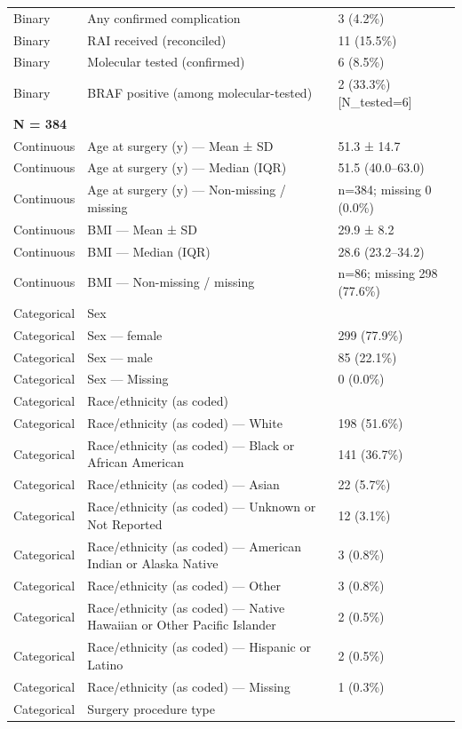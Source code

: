 \begin{table}[htbp]
\begin{tabular}{lll}
Binary & Any confirmed complication & 3 (4.2\%) \\
Binary & RAI received (reconciled) & 11 (15.5\%) \\
Binary & Molecular tested (confirmed) & 6 (8.5\%) \\
Binary & BRAF positive (among molecular-tested) & 2 (33.3\%) [N\_tested=6] \\
\multicolumn{3}{l}{\textbf{N = 384}} \\
Continuous & Age at surgery (y) — Mean ± SD & 51.3 ± 14.7 \\
Continuous & Age at surgery (y) — Median (IQR) & 51.5 (40.0–63.0) \\
Continuous & Age at surgery (y) — Non-missing / missing & n=384; missing 0 (0.0\%) \\
Continuous & BMI — Mean ± SD & 29.9 ± 8.2 \\
Continuous & BMI — Median (IQR) & 28.6 (23.2–34.2) \\
Continuous & BMI — Non-missing / missing & n=86; missing 298 (77.6\%) \\
Categorical & Sex &  \\
Categorical & Sex — female & 299 (77.9\%) \\
Categorical & Sex — male & 85 (22.1\%) \\
Categorical & Sex — Missing & 0 (0.0\%) \\
Categorical & Race/ethnicity (as coded) &  \\
Categorical & Race/ethnicity (as coded) — White & 198 (51.6\%) \\
Categorical & Race/ethnicity (as coded) — Black or African American & 141 (36.7\%) \\
Categorical & Race/ethnicity (as coded) — Asian & 22 (5.7\%) \\
Categorical & Race/ethnicity (as coded) — Unknown or Not Reported & 12 (3.1\%) \\
Categorical & Race/ethnicity (as coded) — American Indian or Alaska Native & 3 (0.8\%) \\
Categorical & Race/ethnicity (as coded) — Other & 3 (0.8\%) \\
Categorical & Race/ethnicity (as coded) — Native Hawaiian or Other Pacific Islander & 2 (0.5\%) \\
Categorical & Race/ethnicity (as coded) — Hispanic or Latino & 2 (0.5\%) \\
Categorical & Race/ethnicity (as coded) — Missing & 1 (0.3\%) \\
Categorical & Surgery procedure type &  \\

\end{tabular}
\end{table}
